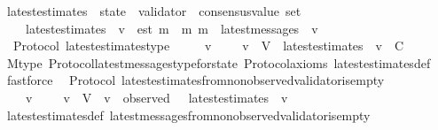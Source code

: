 \begin{isabellebody}
{\isafoldproof}%
%
\isadelimproof
\isanewline
%
\endisadelimproof
\isanewline
\isanewline
\isanewline
\isanewline
\isanewline
\isanewline
{}\isamarkupfalse%
\ latest{\isacharunderscore}estimates\ {\isacharcolon}{\isacharcolon}\ {\isachardoublequoteopen}state\ {\isasymRightarrow}\ validator\ {\isasymRightarrow}\ consensus{\isacharunderscore}value\ set{\isachardoublequoteclose}\isanewline
\ \ \isanewline
\ \ \ \ {\isachardoublequoteopen}latest{\isacharunderscore}estimates\ {\isasymsigma}\ v\ {\isacharequal}\ {\isacharbraceleft}est\ m\ {\isacharbar}\ m{\isachardot}\ m\ {\isasymin}\ latest{\isacharunderscore}messages\ {\isasymsigma}\ v{\isacharbraceright}{\isachardoublequoteclose}\isanewline
\isanewline
{}\isamarkupfalse%
\ {\isacharparenleft}\ Protocol{\isacharparenright}\ latest{\isacharunderscore}estimates{\isacharunderscore}type\ {\isacharcolon}\isanewline
\ \ {\isachardoublequoteopen}{\isasymforall}\ {\isasymsigma}\ v{\isachardot}\ {\isasymsigma}\ {\isasymin}\ {\isasymSigma}\ {\isasymand}\ v\ {\isasymin}\ V\ {\isasymlongrightarrow}\ latest{\isacharunderscore}estimates\ {\isasymsigma}\ v\ {\isasymsubseteq}\ C{\isachardoublequoteclose}\isanewline
%
\isadelimproof
\ \ %
\endisadelimproof
%
\isatagproof
{}\isamarkupfalse%
\ M{\isacharunderscore}type\ Protocol{\isachardot}latest{\isacharunderscore}messages{\isacharunderscore}type{\isacharunderscore}for{\isacharunderscore}state\ Protocol{\isacharunderscore}axioms\ latest{\isacharunderscore}estimates{\isacharunderscore}def\ \isamarkupfalse%
\ fastforce%
\endisatagproof
{\isafoldproof}%
%
\isadelimproof
\isanewline
%
\endisadelimproof
\isanewline
{}\isamarkupfalse%
\ {\isacharparenleft}\ Protocol{\isacharparenright}\ latest{\isacharunderscore}estimates{\isacharunderscore}from{\isacharunderscore}non{\isacharunderscore}observed{\isacharunderscore}validator{\isacharunderscore}is{\isacharunderscore}empty\ {\isacharcolon}\isanewline
\ \ {\isachardoublequoteopen}{\isasymforall}\ {\isasymsigma}\ v{\isachardot}\ {\isasymsigma}\ {\isasymin}\ {\isasymSigma}\ {\isasymand}\ v\ {\isasymin}\ V\ {\isasymand}\ v\ {\isasymnotin}\ observed\ {\isasymsigma}\ {\isasymlongrightarrow}\ latest{\isacharunderscore}estimates\ {\isasymsigma}\ v\ {\isacharequal}\ {\isasymemptyset}{\isachardoublequoteclose}\isanewline
%
\isadelimproof
\ \ %
\endisadelimproof
%
\isatagproof
{}\isamarkupfalse%
\ latest{\isacharunderscore}estimates{\isacharunderscore}def\ latest{\isacharunderscore}messages{\isacharunderscore}from{\isacharunderscore}non{\isacharunderscore}observed{\isacharunderscore}validator{\isacharunderscore}is{\isacharunderscore}empty\ \isamarkupfalse%

\end{isabellebody}
